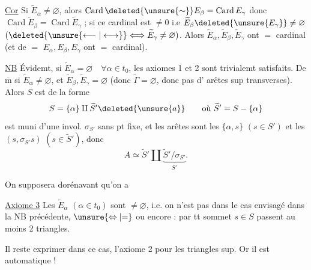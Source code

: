 \uline{Cor} \quad Si  $\widetilde E_\alpha\ne\varnothing$, alors $\operatorname{Card}\deleted{\unsure{\sim}}E_\beta=\operatorname{Card}E_\gamma$ donc $\operatorname{Card}\widetilde E_\beta=\operatorname{Card}\widetilde E_\gamma$ ; si ce  cardinal est $\ne0$ i.e $\widetilde E_\beta\deleted{\unsure{E_\gamma}}\ne\varnothing$ $(\deleted{\unsure{\longleftarrow|\longleftrightarrow}}\Longleftrightarrow\widetilde E_\gamma\ne\varnothing)$. Alors $\widetilde E_\alpha,\widetilde E_\beta,\widetilde E_\gamma$ ont $=$ cardinal (et de $=$ $E_\alpha,E_\beta,E_\gamma$ ont $=$ cardinal).

\uline{NB} \inserted{\unsure{$\times$}}Évidemt, si $\widetilde E_\alpha=\varnothing\quad\forall\alpha\in t_0$, les axiomes  1 et 2 sont trivialemt satisfaits. De $\overline{\mathrm m}$ si $\widetilde E_\alpha\ne\varnothing$, et $\widetilde E_\beta,\widetilde E_\gamma=\varnothing$ (donc $\widetilde\Gamma=\varnothing$, donc pas d'  arêtes sup transverses). Alors  $S$ est  de la forme
\[
S=\{\alpha\}\amalg\widetilde S'\deleted{\unsure{a}}\qquad\text{où }\widetilde S'=S-\{\alpha\}
\]
est muni d'une invol. $\sigma_{S'}$ sans pt fixe, et les arêtes sont les $\{\alpha,s\}$ $(s\in S')$ et les $(s,\sigma_{S'}s)$ $(s\in\widetilde S')$, donc
\[
A\simeq\widetilde S'\amalg\underbrace{\widetilde S'/\sigma_{S'}}_{S'}.
\]

On supposera dorénavant qu'on a 

\noindent\vrule\hspace{.5em}\begin{minipage}{.89\linewidth}\uline{Axiome 3} \quad Les $\widetilde E_\alpha$ $(\alpha\in t_0)$ sont $\ne\varnothing$, i.e. on n'est pas dans le cas  envisagé dans la NB précédente, $\unsure{\Leftrightarrow|{=}}$ ou encore : par tt sommet $s\in S$ passent au moins 2 triangles.\end{minipage}

Il reste exprimer dans ce cas, l'axiome 2 pour les triangles sup. Or il est automatique !



